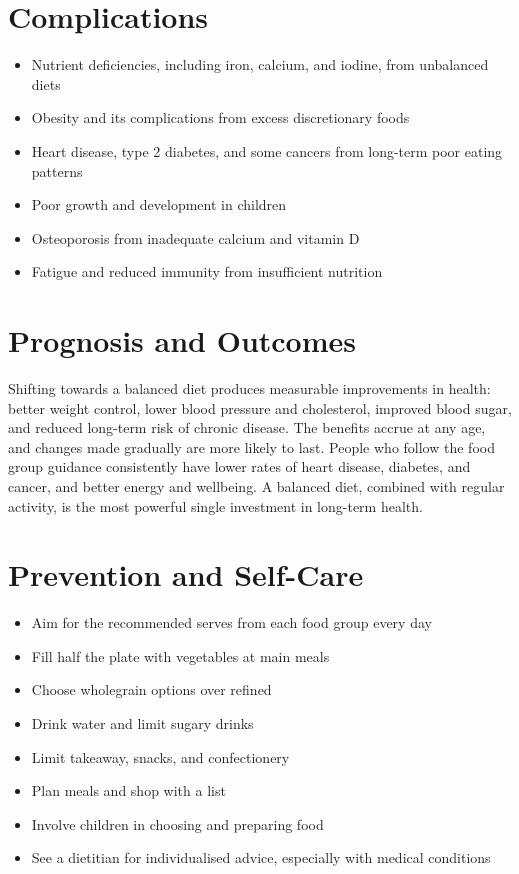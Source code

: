 \section*{Complications}
\begin{itemize}
    \item Nutrient deficiencies, including iron, calcium, and iodine, from unbalanced diets
    \item Obesity and its complications from excess discretionary foods
    \item Heart disease, type 2 diabetes, and some cancers from long-term poor eating patterns
    \item Poor growth and development in children
    \item Osteoporosis from inadequate calcium and vitamin D
    \item Fatigue and reduced immunity from insufficient nutrition
\end{itemize}

\section*{Prognosis and Outcomes}
Shifting towards a balanced diet produces measurable improvements in health: better weight control, lower blood pressure and cholesterol, improved blood sugar, and reduced long-term risk of chronic disease. The benefits accrue at any age, and changes made gradually are more likely to last. People who follow the food group guidance consistently have lower rates of heart disease, diabetes, and cancer, and better energy and wellbeing. A balanced diet, combined with regular activity, is the most powerful single investment in long-term health.

\section*{Prevention and Self-Care}
\begin{itemize}
    \item Aim for the recommended serves from each food group every day
    \item Fill half the plate with vegetables at main meals
    \item Choose wholegrain options over refined
    \item Drink water and limit sugary drinks
    \item Limit takeaway, snacks, and confectionery
    \item Plan meals and shop with a list
    \item Involve children in choosing and preparing food
    \item See a dietitian for individualised advice, especially with medical conditions
\end{itemize}

